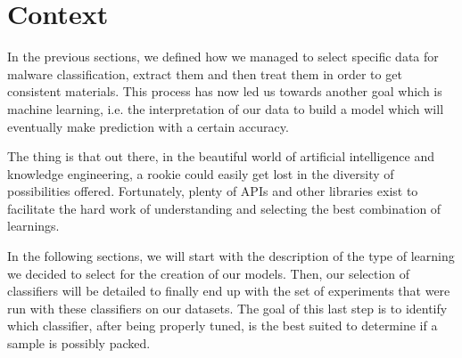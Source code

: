 \section{Context}
In the previous sections, we defined how we managed to select specific data for malware classification, extract them and then treat them in order to get consistent materials. This process has now led us towards another goal which is machine learning, i.e. the interpretation of our data to build a model which will eventually make prediction with a certain accuracy.

The thing is that out there, in the beautiful world of artificial intelligence and knowledge engineering, a rookie could easily get lost in the diversity of possibilities offered. Fortunately, plenty of APIs and other libraries exist to facilitate the hard work of understanding and selecting the best combination of learnings.

In the following sections, we will start with the description of the type of learning we decided to select for the creation of our models. Then, our selection of classifiers will be detailed to finally end up with the set of experiments that were run with these classifiers on our datasets. The goal of this last step is to identify which classifier, after being properly tuned, is the best suited to determine if a sample is possibly packed.